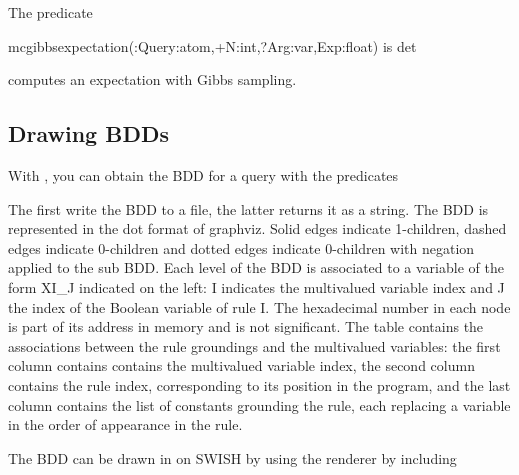 \documentclass[letterpaper,10pt,english]{sphinxmanual}
\begin{document}
The predicate

\begin{sphinxVerbatim}[commandchars=\\\{\}]
mc\PYGZus{}gibbs\PYGZus{}expectation(:Query:atom,+N:int,?Arg:var,\PYGZhy{}Exp:float) is det
\end{sphinxVerbatim}

computes an expectation with Gibbs sampling.


\subsection{Drawing BDDs}
\label{\detokenize{index:drawing-bdds}}
With , you can obtain the BDD for a query with the predicates

\begin{sphinxVerbatim}[commandchars=\\\{\}]
  
  
\end{sphinxVerbatim}

The first write the BDD to a file, the latter returns it as a string.
The BDD is represented in the dot format of graphviz.
Solid edges indicate 1-children, dashed edges indicate 0-children and dotted edges indicate 0-children
with negation applied to the sub BDD.
Each level of the BDD is associated to a variable of the form XI\_J indicated on the left: I indicates the multivalued variable index and J the index of the Boolean variable of rule I.
The hexadecimal number in each node is part of its address in memory and is not significant.
The table  contains the associations between the rule groundings and the multivalued variables: the first column contains contains the multivalued variable index, the second column contains the rule index, corresponding to its position in the program, and the last column contains the list of constants grounding the rule, each replacing a variable in the order of appearance in the rule.

The BDD can be drawn in  on SWISH by using the  renderer by including
\end{document}
